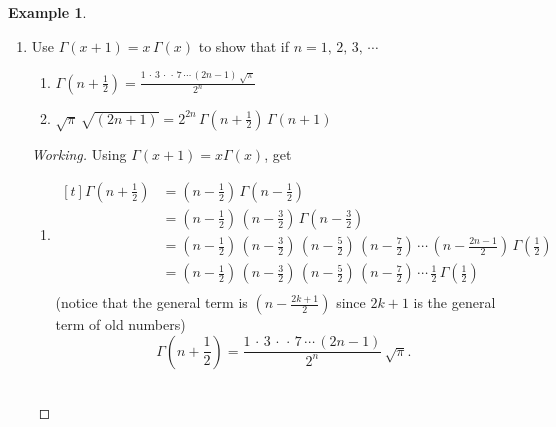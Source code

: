\documentclass[12pt,a4paper]{report}
\theoremstyle{definition}
\newtheorem{exa}[thm]{Example}
\theoremstyle{plain}
\begin{document}
\begin{exa}
\begin{enumerate}
\item[(e).] Use $\Gamma(x + 1) = x\, \Gamma(x)$ to show that if $n = 1, \, 2, \, 3, \, \cdots$
\begin{enumerate}
\item[(i).] $\displaystyle{\Gamma\left(n + \frac{1}{2}\right) = \frac{1\, \cdot\, 3\, \cdot\, \cdot\, 7\, \cdots\, (2n-1)\, \sqrt{\pi}}{2^n}}$\\

\item[(ii).] $\displaystyle{\sqrt{\pi}\, \sqrt{(2n + 1)} = 2^{2n}\, \Gamma\left(n + \frac{1}{2}\right)\, \Gamma(n+1)}$\\
\end{enumerate}


\begin{proof}[Working]
Using $\Gamma(x + 1) = x\Gamma(x)$, get
\begin{enumerate}
\item[(i).] $\begin{aligned}[t]
            \Gamma\left(n + \frac{1}{2}\right) & =  \left(n - \frac{1}{2}\right)\, \Gamma\left(n-\frac{1}{2}\right)\\
              & = \left(n - \frac{1}{2}\right)\, \left(n-\frac{3}{2}\right)\, \Gamma\left(n-\frac{3}{2}\right)\\
              & = \left(n-\frac{1}{2}\right)\, \left(n - \frac{3}{2}\right)\, \left(n-\frac{5}{2}\right)\, \left(n-\frac{7}{2}\right) \, \cdots \, \left(n - \frac{2n-1}{2}\right)\, \Gamma\left(\frac{1}{2}\right)\\
              & = \left(n-\frac{1}{2}\right)\, \left(n - \frac{3}{2}\right)\, \left(n-\frac{5}{2}\right)\, \left(n-\frac{7}{2}\right) \, \cdots \, \frac{1}{2}\, \Gamma\left(\frac{1}{2}\right)\\
           \end{aligned}$\\
           
(notice that the general term is $\left(n-\frac{2k + 1}{2}\right)$ since $2k + 1$ is the general term of old numbers)
$$\Gamma\left(n + \frac{1}{2}\right) = \frac{1\, \cdot\, 3\, \cdot\, \cdot\, 7\, \cdots\, (2n-1)}{2^n}\, \sqrt{\pi}.$$\\




\end{enumerate}
\end{proof}
\end{enumerate}
\end{exa}
\end{document}
